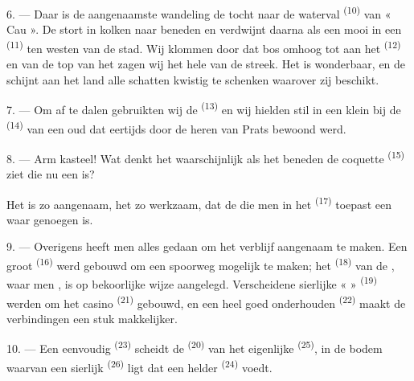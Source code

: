 \VUsaut{3.0mm}
\VUsaut{3.0mm}

6. --- Daar is de aangenaamste wandeling de tocht naar de waterval \textsuperscript{(10)} van
« Cau ». De  stort in kolken naar beneden en verdwijnt daarna als een mooi
 in een  \textsuperscript{(11)} ten westen van de stad. Wij
klommen door dat bos omhoog tot aan het 
\textsuperscript{(12)} en van de top van het  zagen wij het hele
 van de streek. Het  is wonderbaar, en de 
schijnt aan het land alle schatten kwistig te schenken waarover zij beschikt.

7. --- Om af te dalen gebruikten wij de  \textsuperscript{(13)} en wij
hielden stil in een klein  bij de
 \textsuperscript{(14)} van een oud  dat
eertijds door de heren van Prats bewoond werd.

8. --- Arm kasteel! Wat denkt het waarschijnlijk als het beneden de coquette
 \textsuperscript{(15)} ziet die nu een
 is?

Het  is zo aangenaam, het  zo werkzaam, dat de
 die men in het  \textsuperscript{(17)} toepast een waar
genoegen is.

\VUsaut{3.0mm}
\VUsaut{3.0mm}

9. --- Overigens heeft men alles gedaan om het verblijf aangenaam te maken. Een groot
 \textsuperscript{(16)} werd gebouwd om een spoorweg mogelijk te maken; het
 \textsuperscript{(18)} van de
, waar men , is op bekoorlijke
wijze aangelegd. Verscheidene sierlijke «  » \textsuperscript{(19)} werden om
het casino \textsuperscript{(21)} gebouwd, en een heel goed onderhouden 
\textsuperscript{(22)} maakt de verbindingen een stuk makkelijker.

10. --- Een eenvoudig  \textsuperscript{(23)} scheidt de
 \textsuperscript{(20)} van het eigenlijke 
\textsuperscript{(25)}, in de bodem waarvan een sierlijk 
\textsuperscript{(26)} ligt dat een helder  \textsuperscript{(24)} voedt.

